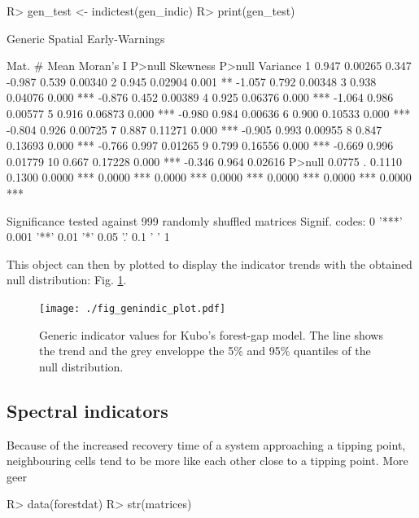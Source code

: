 \documentclass{article}
\begin{document}
\begin{Schunk}
\begin{Sinput}
R>   gen_test <- indictest(gen_indic)
R>   print(gen_test)
\end{Sinput}
\begin{Soutput}
Generic Spatial Early-Warnings

 Mat. #  Mean Moran's I P>null     Skewness P>null     Variance
      1 0.947   0.00265  0.347       -0.987  0.539      0.00340
      2 0.945   0.02904  0.001 **    -1.057  0.792      0.00348
      3 0.938   0.04076  0.000 ***   -0.876  0.452      0.00389
      4 0.925   0.06376  0.000 ***   -1.064  0.986      0.00577
      5 0.916   0.06873  0.000 ***   -0.980  0.984      0.00636
      6 0.900   0.10533  0.000 ***   -0.804  0.926      0.00725
      7 0.887   0.11271  0.000 ***   -0.905  0.993      0.00955
      8 0.847   0.13693  0.000 ***   -0.766  0.997      0.01265
      9 0.799   0.16556  0.000 ***   -0.669  0.996      0.01779
     10 0.667   0.17228  0.000 ***   -0.346  0.964      0.02616
 P>null    
 0.0775 .  
 0.1110    
 0.1300    
 0.0000 ***
 0.0000 ***
 0.0000 ***
 0.0000 ***
 0.0000 ***
 0.0000 ***
 0.0000 ***

 Significance tested against 999 randomly shuffled matrices
 Signif. codes:  0 '***' 0.001 '**' 0.01 '*' 0.05 '.' 0.1 ' ' 1 
\end{Soutput}
\end{Schunk}

This object can then by plotted to display the indicator trends with the 
obtained null distribution: Fig. \ref{genindic_plot}. 
  
\begin{figure}
  \texttt{[image: ./fig\_genindic\_plot.pdf]}
  \caption{Generic indicator values for Kubo's forest-gap model. The line shows 
           the trend and the grey enveloppe the 5\% and 95\% quantiles of the 
           null distribution.}
  \label{genindic_plot}
\end{figure}

  \subsection{Spectral indicators}
  \label{spectral_ic}
  
  Because of the increased recovery time of a system approaching a tipping 
  point, neighbouring cells tend to be more like each other close to a tipping
  point. More geer
  
  
\begin{Schunk}
\begin{Sinput}
R>   data(forestdat)
R>   str(matrices)
\end{Sinput}
\end{Schunk}
\end{document}

